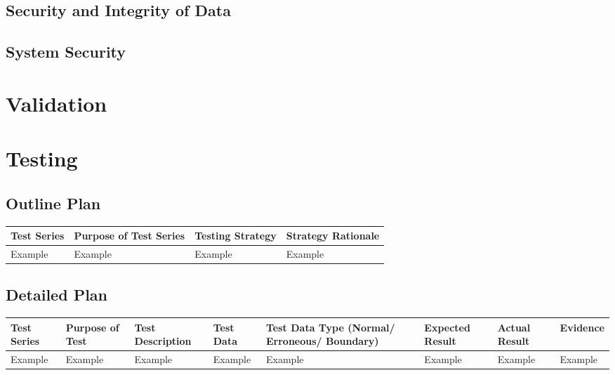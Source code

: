 \subsection{Security and Integrity of Data}

\subsection{System Security}

\section{Validation}

\section{Testing}

\begin{landscape}
\subsection{Outline Plan}

\begin{center}
    \begin{tabular}{|p{2cm}|p{5cm}|p{5cm}|p{4cm}|}
        \hline
        \textbf{Test Series} & \textbf{Purpose of Test Series} & \textbf{Testing Strategy} & \textbf{Strategy Rationale}\\ \hline
        Example & Example & Example & Example \\ \hline
    \end{tabular}
\end{center}

\subsection{Detailed Plan}

\begin{center}
    \begin{longtable}{|p{1.5cm}|p{2.5cm}|p{2.5cm}|p{2cm}|p{2cm}|p{2cm}|p{2cm}|p{2cm}|}
        \hline
        \textbf{Test Series} & \textbf{Purpose of Test} & \textbf{Test Description} & \textbf{Test Data} & \textbf{Test Data Type (Normal/ Erroneous/ Boundary)} & \textbf{Expected Result} & \textbf{Actual Result} & \textbf{Evidence}\\ \hline
        Example & Example & Example & Example & Example & Example & Example & Example \\ \hline
    \end{longtable}
\end{center}
\end{landscape}
